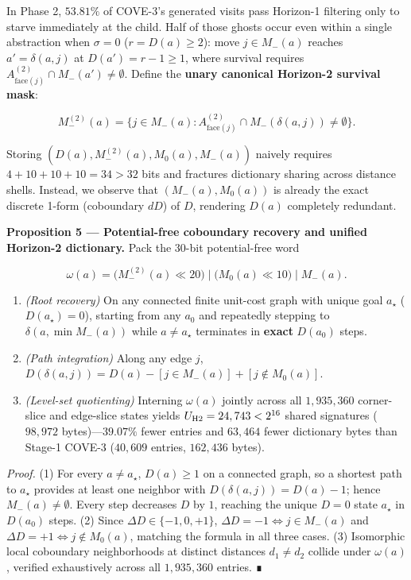 \documentclass[10pt,twocolumn,letterpaper]{article}
\providecommand{\tightlist}{\setlength{\itemsep}{0pt}\setlength{\parskip}{0pt}}
\begin{document}
In Phase 2, \(53.81\%\) of COVE-3's generated visits pass Horizon-1
filtering only to starve immediately at the child. Half of those ghosts
occur even within a single abstraction when \(\sigma = 0\)
(\(r = D(a) \ge 2\)): move \(j \in M_-(a)\) reaches \(a' = \delta(a,j)\)
at \(D(a') = r - 1 \ge 1\), where survival requires
\(A_{\text{face}(j)}^{(2)} \cap M_-(a') \ne \emptyset\). Define the
\textbf{unary canonical Horizon-2 survival mask}:

\[
M_-^{(2)}(a) = \bigl\{j \in M_-(a) : A_{\text{face}(j)}^{(2)} \cap M_-(\delta(a,j)) \ne \emptyset\bigr\}.
\tag{8}
\]

Storing \((D(a), M_-^{(2)}(a), M_0(a), M_-(a))\) naively requires
\(4 + 10 + 10 + 10 = 34 > 32\) bits and fractures dictionary sharing
across distance shells. Instead, we observe that \((M_-(a), M_0(a))\) is
already the exact discrete 1-form (coboundary \(dD\)) of \(D\),
rendering \(D(a)\) completely redundant.

\textbf{Proposition 5 --- Potential-free coboundary recovery and unified
Horizon-2 dictionary.} Pack the 30-bit potential-free word

\[
\omega(a) = \bigl(M_-^{(2)}(a)\ll 20\bigr)\mathbin{|}\bigl(M_0(a)\ll 10\bigr)\mathbin{|}M_-(a).
\tag{9}
\]

\begin{enumerate}
\def\labelenumi{\arabic{enumi}.}
\tightlist
\item
  \emph{(Root recovery)} On any connected finite unit-cost graph with
  unique goal \(a_\star\) (\(D(a_\star)=0\)), starting from any \(a_0\)
  and repeatedly stepping to \(\delta(a, \min M_-(a))\) while
  \(a \ne a_\star\) terminates in \textbf{exact} \(D(a_0)\) steps.
\item
  \emph{(Path integration)} Along any edge \(j\),
  \(D(\delta(a,j)) = D(a) - [j \in M_-(a)] + [j \notin M_0(a)]\).
\item
  \emph{(Level-set quotienting)} Interning \(\omega(a)\) jointly across
  all \(1,935,360\) corner-slice and edge-slice states yields
  \(U_{\rm H2} = 24,743 < 2^{16}\) shared signatures (\(98,972\)
  bytes)---\(39.07\%\) fewer entries and \(63,464\) fewer dictionary
  bytes than Stage-1 COVE-3 (\(40,609\) entries, \(162,436\) bytes).
\end{enumerate}

\emph{Proof.} (1) For every \(a \ne a_\star\), \(D(a) \ge 1\) on a
connected graph, so a shortest path to \(a_\star\) provides at least one
neighbor with \(D(\delta(a,j)) = D(a)-1\); hence
\(M_-(a) \ne \emptyset\). Every step decreases \(D\) by \(1\), reaching
the unique \(D=0\) state \(a_\star\) in \(D(a_0)\) steps. (2) Since
\(\Delta D \in \{-1, 0, +1\}\), \(\Delta D = -1 \iff j \in M_-(a)\) and
\(\Delta D = +1 \iff j \notin M_0(a)\), matching the formula in all
three cases. (3) Isomorphic local coboundary neighborhoods at distinct
distances \(d_1 \ne d_2\) collide under \(\omega(a)\), verified
exhaustively across all \(1,935,360\) entries. ∎
\end{document}
